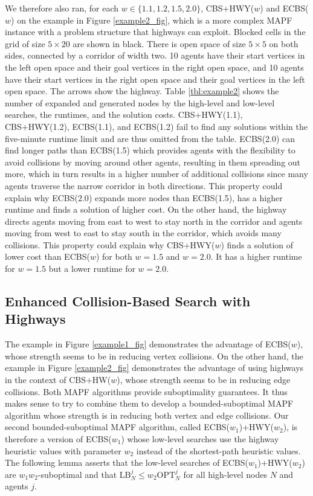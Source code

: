 \documentclass[letterpaper]{article}
\theoremstyle{definition}
\newcommand{\lbna}[2]{\ensuremath{\mbox{LB}_{#1}^{#2}}}
\newcommand{\optna}[2]{\ensuremath{\mbox{OPT}_{#1}^{#2}}}
\begin{document}
We therefore also ran, for each $w \in \{ 1.1, 1.2, 1.5, 2.0 \}$, CBS+HWY($w$)
and ECBS($w$) on the example in Figure \ref{example2_fig}, which is a more
complex MAPF instance with a problem structure that highways can
exploit. Blocked cells in the grid of size $5 \times 20$ are shown in
black. There is open space of size $5 \times 5$ on both sides, connected by a
corridor of width two. 10 agents have their start vertices in the left open
space and their goal vertices in the right open space, and 10 agents have
their start vertices in the right open space and their goal vertices in the
left open space. The arrows show the highway. Table \ref{tbl:example2} shows
the number of expanded and generated nodes by the high-level and low-level
searches, the runtimes, and the solution costs.  CBS+HWY(1.1), CBS+HWY(1.2),
ECBS(1.1), and ECBS(1.2) fail to find any solutions within the five-minute
runtime limit and are thus omitted from the table. ECBS(2.0) can find longer
paths than ECBS(1.5) which provides agents with the flexibility to avoid
collisions by moving around other agents, resulting in them spreading out
more, which in turn results in a higher number of additional collisions since
many agents traverse the narrow corridor in both directions. This property
could explain why ECBS($2.0$) expands more nodes than ECBS(1.5), has a higher
runtime and finds a solution of higher cost. On the other hand, the highway
directs agents moving from east to west to stay north in the corridor and
agents moving from west to east to stay south in the corridor, which avoids
many collisions. This property could explain why CBS+HWY($w$) finds a solution
of lower cost than ECBS($w$) for both $w=1.5$ and $w=2.0$. It has a higher
runtime for $w=1.5$ but a lower runtime for $w=2.0$.

\subsection{Enhanced Collision-Based Search with Highways}

The example in Figure \ref{example1_fig} demonstrates the advantage of
ECBS($w$), whose strength seems to be in reducing vertex collisions. On the
other hand, the example in Figure \ref{example2_fig} demonstrates the
advantage of using highways in the context of CBS+HW($w$), whose strength
seems to be in reducing edge collisions. Both MAPF algorithms provide
suboptimality guarantees. It thus makes sense to try to combine them to
develop a bounded-suboptimal MAPF algorithm whose strength is in reducing both
vertex and edge collisions. Our second bounded-suboptimal MAPF algorithm,
called ECBS($w_1$)+HWY($w_2$), is therefore a version of ECBS($w_1$) whose
low-level searches use the highway heuristic values with parameter $w_2$
instead of the shortest-path heuristic values.  The following lemma asserts
that the low-level searches of ECBS($w_1$)+HWY($w_2$) are $w_1 w_2$-suboptimal
and that $\lbna N j \leq w_2 \optna N j$ for all high-level nodes $N$ and
agents $j$.
\end{document}
